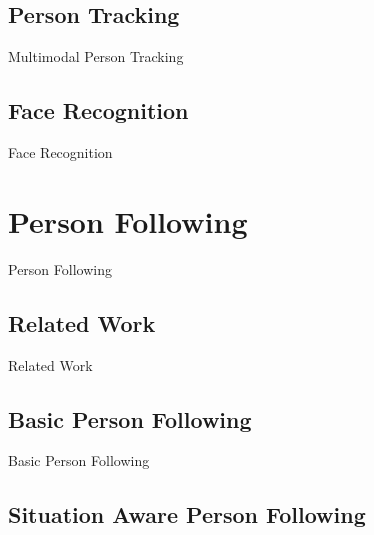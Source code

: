 \documentclass[12pt]{gatech-thesis}
\begin{document}
\section{Person Tracking}
\label{sec:multimodal_person_tracking}



Multimodal Person Tracking

\section{Face Recognition}
\label{sec:multimodal_face_recognition}

Face Recognition



\chapter{Person Following}

Person Following

\section{Related Work}

Related Work

\section{Basic Person Following}
\label{sec:following_basic_person_following}

Basic Person Following

\section{Situation Aware Person Following}
\end{document}
